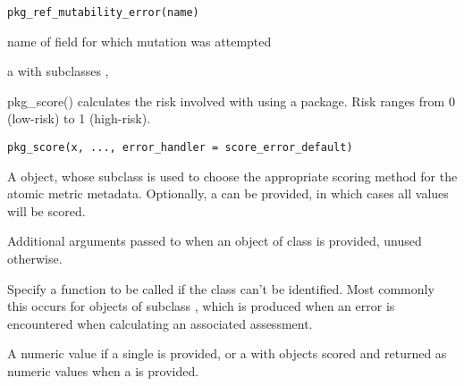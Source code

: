 \documentclass[a4paper]{book}
\begin{document}
%
\begin{Usage}
\begin{verbatim}
pkg_ref_mutability_error(name)
\end{verbatim}
\end{Usage}
%
\begin{Arguments}
\begin{ldescription}
\item[\code{name}] name of field for which mutation was attempted
\end{ldescription}
\end{Arguments}
%
\begin{Value}
a  with subclasses ,
\end{Value}
%
\begin{Description}
pkg\_score() calculates the risk involved with using a package. Risk ranges
from 0 (low-risk) to 1 (high-risk).
\end{Description}
%
\begin{Usage}
\begin{verbatim}
pkg_score(x, ..., error_handler = score_error_default)
\end{verbatim}
\end{Usage}
%
\begin{Arguments}
\begin{ldescription}
\item[\code{x}] A  object, whose subclass is used to choose the
appropriate scoring method for the atomic metric metadata. Optionally, a
 can be provided, in which cases all
 values will be scored.

\item[\code{...}] Additional arguments passed to  when an
object of class  is provided, unused otherwise.

\item[\code{error\_handler}] Specify a function to be called if the class can't be
identified. Most commonly this occurs for  objects of
subclass , which is produced when an error is
encountered when calculating an associated assessment.
\end{ldescription}
\end{Arguments}
%
\begin{Value}
A numeric value if a single  is provided, or a
 with  objects scored and
returned as numeric values when a  is provided.
\end{Value}
\end{document}

